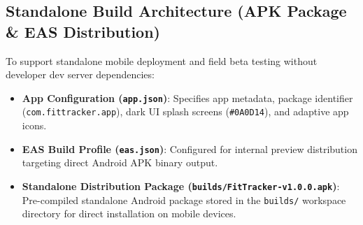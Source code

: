 \subsection{Standalone Build Architecture (APK Package \& EAS Distribution)}
To support standalone mobile deployment and field beta testing without developer dev server dependencies:
\begin{itemize}
    \item \textbf{App Configuration (\texttt{app.json})}: Specifies app metadata, package identifier (\texttt{com.fittracker.app}), dark UI splash screens (\texttt{\#0A0D14}), and adaptive app icons.
    \item \textbf{EAS Build Profile (\texttt{eas.json})}: Configured for internal preview distribution targeting direct Android APK binary output.
    \item \textbf{Standalone Distribution Package (\texttt{builds/FitTracker-v1.0.0.apk})}: Pre-compiled standalone Android package stored in the \texttt{builds/} workspace directory for direct installation on mobile devices.
\end{itemize}

